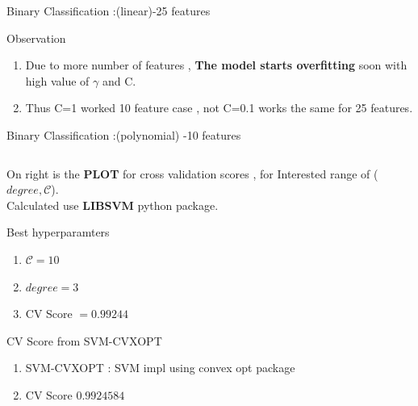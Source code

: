 \documentclass[12pt,t]{beamer}
\begin{document}
\begin{frame}[t]{Binary Classification :(linear)-25 features}
    \begin{block}{Observation}
        \begin{enumerate}
            \item Due to more number of features , \textbf{The model starts overfitting} soon 
                with high value of $\gamma$ and C.
            \item Thus C=1 worked 10 feature case , not C=0.1 works the same for 25 features.
        \end{enumerate}
    \end{block}
\end{frame}


\begin{frame}[t]{Binary Classification :(polynomial) -10 features}
    \scriptsize

    \begin{columns}
        \begin{column}[T]{0.35\linewidth}
            On right is the \textbf{PLOT} for cross validation scores , for Interested range
            of ($ degree, \mathcal{C}$). \\ 

            Calculated use \textbf{LIBSVM} python package.


            \begin{block}{Best hyperparamters}
                \begin{enumerate}
                    \item  $\mathcal{C} = 10$
                    \item $degree = 3$ 
                    \item CV Score  $ = 0.99244$
                \end{enumerate}
                    
            \end{block}

            \begin{block}{CV Score from SVM-CVXOPT}
                \begin{enumerate}
                    \item SVM-CVXOPT : SVM impl using convex opt package
                    \item CV Score $0.9924584$
                \end{enumerate}
            \end{block}
  

\end{column}
\end{columns}
\end{frame}
\end{document}
